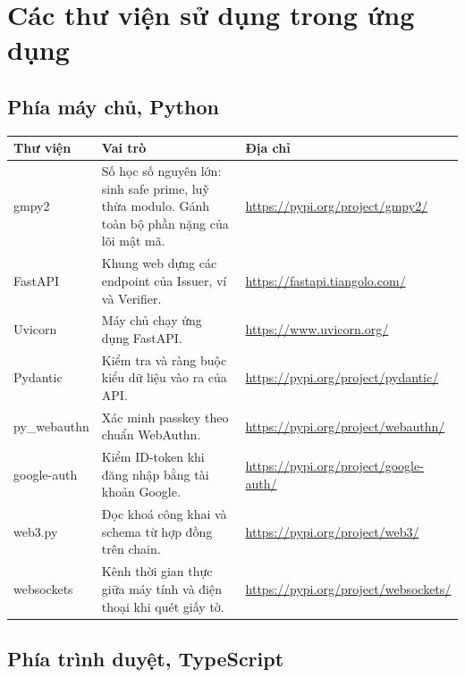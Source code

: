 \documentclass[a4paper,11pt,oneside]{report}
\theoremstyle{definition}
\theoremstyle{plain}
\begin{document}
\appendix

\chapter{Các thư viện sử dụng trong ứng dụng}

\section{Phía máy chủ, Python}

\begin{longtable}{@{}p{2.8cm}p{6.4cm}p{4.6cm}@{}}
\toprule
\textbf{\sffamily Thư viện} & \textbf{\sffamily Vai trò} & \textbf{\sffamily Địa chỉ} \\
\midrule
\endhead
gmpy2 & Số học số nguyên lớn: sinh safe prime, luỹ thừa modulo. Gánh toàn bộ phần nặng của lõi mật mã. & \url{https://pypi.org/project/gmpy2/} \\
\addlinespace
FastAPI & Khung web dựng các endpoint của Issuer, ví và Verifier. & \url{https://fastapi.tiangolo.com/} \\
\addlinespace
Uvicorn & Máy chủ chạy ứng dụng FastAPI. & \url{https://www.uvicorn.org/} \\
\addlinespace
Pydantic & Kiểm tra và ràng buộc kiểu dữ liệu vào ra của API. & \url{https://pypi.org/project/pydantic/} \\
\addlinespace
py\_webauthn & Xác minh passkey theo chuẩn WebAuthn. & \url{https://pypi.org/project/webauthn/} \\
\addlinespace
google-auth & Kiểm ID-token khi đăng nhập bằng tài khoản Google. & \url{https://pypi.org/project/google-auth/} \\
\addlinespace
web3.py & Đọc khoá công khai và schema từ hợp đồng trên chain. & \url{https://pypi.org/project/web3/} \\
\addlinespace
websockets & Kênh thời gian thực giữa máy tính và điện thoại khi quét giấy tờ. & \url{https://pypi.org/project/websockets/} \\
\bottomrule
\end{longtable}

\section{Phía trình duyệt, TypeScript}
\end{document}
